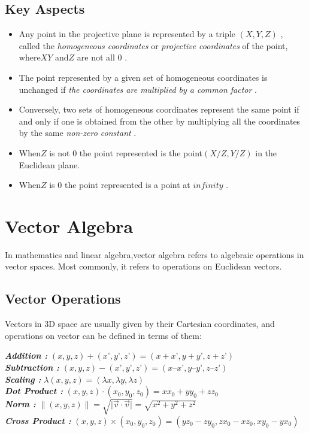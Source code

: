\documentclass[12pt]{report}
\begin{document}
\subsection{Key Aspects}
\begin{itemize}
  \item 
  Any point in the projective plane is represented by a triple $ (X,Y,Z) $ , called the\textit{ homogeneous coordinates } or\textit{ projective coordinates }of the point, where$ X Y $ and$ Z $ are not all $ 0 $ .
  \item 
  The point represented by a given set of homogeneous coordinates is unchanged if \textit{  the coordinates are multiplied by a common factor }.
  \item 
  Conversely, two sets of homogeneous coordinates represent the same point if and only if one is obtained from the other by multiplying all the coordinates by the same  \textit{ non-zero constant }.
  \item 
  When$ Z $ is not $ 0$  the point represented is the point$ (X/Z,Y/Z)$ in the Euclidean plane.
  \item 
  When$ Z $ is $ 0$  the point represented is a point at $ infinity $ .
\end{itemize}

\section{Vector Algebra}


\hspace{1cm} In mathematics and linear algebra,vector algebra refers to algebraic operations in vector spaces. Most commonly, it refers to operations on Euclidean vectors.

\subsection{Vector Operations}

Vectors in 3D space are usually given by their Cartesian coordinates, and operations on vector can be defined in terms of them:

\indent \textbf{\textit{Addition : }} $ (x, y, z) + (x’ , y’ ,z’) = (x + x’, y + y’, z + z’) $  \\
\indent \textbf{\textit{Subtraction : }} $(x, y, z) − (x’ , y’ ,z’) = (x – x’ ,y – y’, z – z’)$ \\
\indent \textbf{\textit{Scaling : }} $ \lambda (x, y, z) = (\lambda x, \lambda y, \lambda z)  $ \\
\indent \textbf{\textit{Dot Product : }}$ (x, y, z) \cdot (x_{0} , y_{0} ,z_{0} ) = x x_{0} + y y_{0} + z z_{0} $ \\
\indent \textbf{\textit{Norm : }} $ \| ( x , y , z ) \| = \sqrt{\vert \overrightarrow{v} \cdot \overrightarrow{v} \vert } = \sqrt{x^2 + y^2 + z^2} $ \\
\indent \textbf{\textit{Cross Product : }} $ (x, y, z ) \times (x_{0} , y_{0} ,z_{0} ) = (y z_{0} − z y_{0} ,z x_{0} − x z_{0} , x y_{0} − y x_{0} ) $ \\
\end{document}
